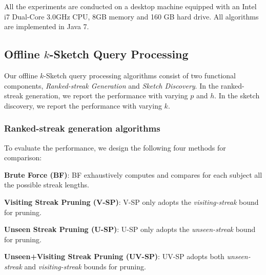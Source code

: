 All the experiments are conducted on a desktop machine equipped with an Intel i7 Dual-Core 3.0GHz CPU, 8GB memory and 160 GB hard drive. All algorithms are implemented in Java 7. 
 
\subsection{Offline $k$-Sketch Query Processing}
\label{subsec:exp-offline}
Our offline $k$-Sketch query processing algorithms consist of two functional components, \emph{Ranked-streak Generation}
and \emph{Sketch Discovery}. In the ranked-streak generation, we report the performance with varying $p$ and $h$. In the sketch discovery, we report the performance with varying $k$.

\subsubsection{Ranked-streak generation algorithms}
To evaluate the performance, we design the following four methods for comparison:

\noindent\textbf{Brute Force (BF)}: BF exhaustively computes and compares for each subject all the possible streak lengths. 

\noindent\textbf{Visiting Streak Pruning (V-SP)}: V-SP only adopts the \emph{visiting-streak} bound for pruning.

\noindent\textbf{Unseen Streak Pruning (U-SP)}: U-SP only adopts the \emph{unseen-streak} bound for pruning. 

\noindent\textbf{Unseen+Visiting Streak Pruning (UV-SP)}: UV-SP adopts both \emph{unseen-streak} and \emph{visiting-streak} bounds for pruning.

